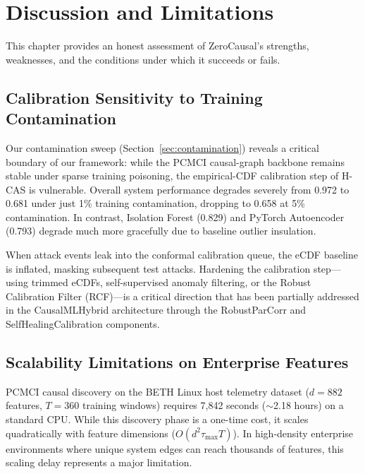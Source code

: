 \chapter{Discussion and Limitations}
\label{ch:discussion}

This chapter provides an honest assessment of ZeroCausal's strengths, weaknesses, and the conditions under which it succeeds or fails.

\section{Calibration Sensitivity to Training Contamination}

Our contamination sweep (Section~\ref{sec:contamination}) reveals a critical boundary of our framework: while the PCMCI causal-graph backbone remains stable under sparse training poisoning, the empirical-CDF calibration step of H-CAS is vulnerable. Overall system performance degrades severely from 0.972 to 0.681 under just 1\% training contamination, dropping to 0.658 at 5\% contamination. In contrast, Isolation Forest (0.829) and PyTorch Autoencoder (0.793) degrade much more gracefully due to baseline outlier insulation.

When attack events leak into the conformal calibration queue, the eCDF baseline is inflated, masking subsequent test attacks. Hardening the calibration step---using trimmed eCDFs, self-supervised anomaly filtering, or the Robust Calibration Filter (RCF)---is a critical direction that has been partially addressed in the CausalMLHybrid architecture through the RobustParCorr and SelfHealingCalibration components.

\section{Scalability Limitations on Enterprise Features}

PCMCI causal discovery on the BETH Linux host telemetry dataset ($d = 882$ features, $T = 360$ training windows) requires 7,842 seconds ($\sim$2.18 hours) on a standard CPU. While this discovery phase is a one-time cost, it scales quadratically with feature dimensions ($O(d^2 \tau_{\max} T)$). In high-density enterprise environments where unique system edges can reach thousands of features, this scaling delay represents a major limitation.

